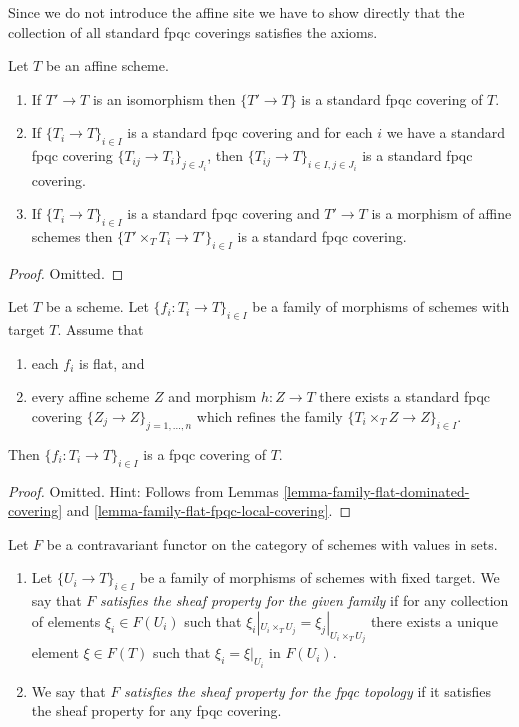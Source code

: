 \noindent
Since we do not introduce the affine site we have to show directly
that the collection of all standard fpqc coverings satisfies the
axioms.

\begin{lemma}
\label{lemma-fpqc-affine-axioms}
Let $T$ be an affine scheme.
\begin{enumerate}
\item If $T' \to T$ is an isomorphism then $\{T' \to T\}$
is a standard fpqc covering of $T$.
\item If $\{T_i \to T\}_{i\in I}$ is a standard fpqc covering and for each
$i$ we have a standard fpqc covering $\{T_{ij} \to T_i\}_{j\in J_i}$, then
$\{T_{ij} \to T\}_{i \in I, j\in J_i}$ is a standard fpqc covering.
\item If $\{T_i \to T\}_{i\in I}$ is a standard fpqc covering
and $T' \to T$ is a morphism of affine schemes then
$\{T' \times_T T_i \to T'\}_{i\in I}$ is a standard fpqc covering.
\end{enumerate}
\end{lemma}

\begin{proof}
Omitted.
\end{proof}

\begin{lemma}
\label{lemma-fpqc-covering-affines-mapping-in}
Let $T$ be a scheme. Let $\{f_i : T_i \to T\}_{i \in I}$ be a family of
morphisms of schemes with target $T$. Assume that
\begin{enumerate}
\item each $f_i$ is flat, and
\item every affine scheme
$Z$ and morphism $h : Z \to T$ there exists a standard fpqc covering
$\{Z_j \to Z\}_{j = 1, \ldots, n}$ which refines the family
$\{T_i \times_T Z \to Z\}_{i \in I}$.
\end{enumerate}
Then $\{f_i : T_i \to T\}_{i \in I}$ is a fpqc covering of $T$.
\end{lemma}

\begin{proof}
Omitted. Hint: Follows from Lemmas
\ref{lemma-family-flat-dominated-covering} and
\ref{lemma-family-flat-fpqc-local-covering}.
\end{proof}

\begin{definition}
\label{definition-sheaf-property-fpqc}
Let $F$ be a contravariant functor on the category
of schemes with values in sets.
\begin{enumerate}
\item Let $\{U_i \to T\}_{i \in I}$ be a family of morphisms
of schemes with fixed target.
We say that $F$ {\it satisfies the sheaf property for the given family}
if for any collection of elements $\xi_i \in F(U_i)$ such that
$\xi_i|_{U_i \times_T U_j} = \xi_j|_{U_i \times_T U_j}$
there exists a unique element
$\xi \in F(T)$ such that $\xi_i = \xi|_{U_i}$ in $F(U_i)$.
\item We say that $F$ {\it satisfies the sheaf property for the
fpqc topology} if it satisfies the sheaf property for any
fpqc covering.
\end{enumerate}
\end{definition}

